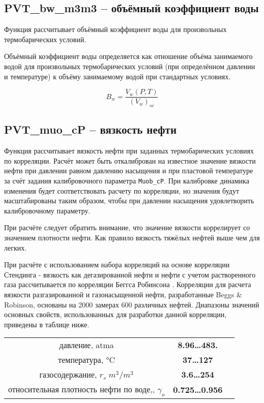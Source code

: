 \subsection{PVT\_bw\_m3m3 – объёмный коэффициент воды}
Функция рассчитывает объёмный коэффициент воды для произвольных термобарических условий. 

Объёмный коэффициент воды определяется как отношение объёма занимаемого водой для произвольных термобарических условий (при определённом давлении и температуре) к объёму занимаемому водой при стандартных условиях. 

$$B_w = \frac{V_w(P,T)}{(V_w)_{sc}}$$


\subsection{PVT\_muo\_cP – вязкость нефти}
Функция рассчитывает вязкость нефти при заданных термобарических условиях по корреляции. Расчёт может быть откалиброван на известное значение вязкости нефти при давлении равном давлению насыщения и при пластовой температуре за счёт задания калибровочного параметра \texttt{Muob_cP}. При калибровке динамика изменения будет соответствовать расчету по корреляции, но значения будут масштабированы таким образом, чтобы при давлении насыщения удовлетворить калибровочному параметру.

При расчёте следует обратить внимание, что значение вязкости коррелирует со значением плотности нефти. Как правило вязкость тяжёлых нефтей выше чем для легких.

При расчёте с использованием набора корреляций на основе корреляции Стендинга - вязкость как дегазированной нефти и нефти с учетом растворенного газа рассчитывается по корреляции Беггса Робинсона \cite{Yukos_PVT_2002}. 
Корреляции для расчета вязкости разгазированной и газонасыщенной нефти, разработанные Beggs \& Robinson, основаны на 2000 замерах 600 различных нефтей.
Диапазоны значений основных свойств, использованных для разработки данной корреляции, приведены в таблице ниже.
\begin{center}
	\begin{tabular}{ccc}
		давление, atma & \textbf{8.96…483.} \\
		температура, °C & \textbf{37…127}  \\
		газосодержание, $r_s \; m^3 /m^3$ & \textbf{3.6…254}\\
		относительная плотность нефти по воде,, $\gamma_o$ & \textbf{0.725…0.956} \\
	\end{tabular}
\end{center}
   
